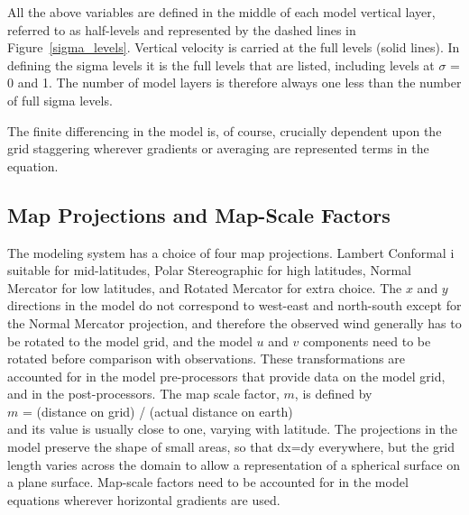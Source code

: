 All the above variables are defined in the middle of each model vertical layer,
referred to as half-levels and represented by the dashed lines in 
Figure~\ref{sigma_levels}. Vertical velocity is carried at the full levels
(solid lines). In defining the sigma levels it is the full levels that are
listed, including levels at $\sigma$ = 0 and 1. The number of model layers is
therefore always one less than the number of full sigma levels.

The finite differencing in the model is, of course, crucially dependent upon
the grid staggering wherever gradients or averaging are represented terms in
the equation.

\subsection{Map Projections and Map-Scale Factors}

The modeling system has a choice of four map projections. Lambert Conformal i
suitable for mid-latitudes, Polar Stereographic for high latitudes,
Normal Mercator for low latitudes, and Rotated Mercator for extra choice.
The $x$ and $y$ directions in the model do not correspond to west-east and
north-south except for the Normal Mercator projection, and therefore the
observed wind generally has to be rotated to the model grid, and the model $u$
and $v$ components need to be rotated before comparison with observations.
These transformations are accounted for in the model pre-processors that provide
data on the model grid, and in the post-processors. The map scale factor, $m$,
is defined by \\

$m$ = (distance on grid) / (actual distance on earth)
\noindent \\

and its value is usually close to one, varying with latitude. The projections in
the model preserve the shape of small areas, so that dx=dy everywhere, but the
grid length varies across the domain to allow a representation of a spherical
surface on a plane surface. Map-scale factors need to be accounted for in the
model equations wherever horizontal gradients are used.

